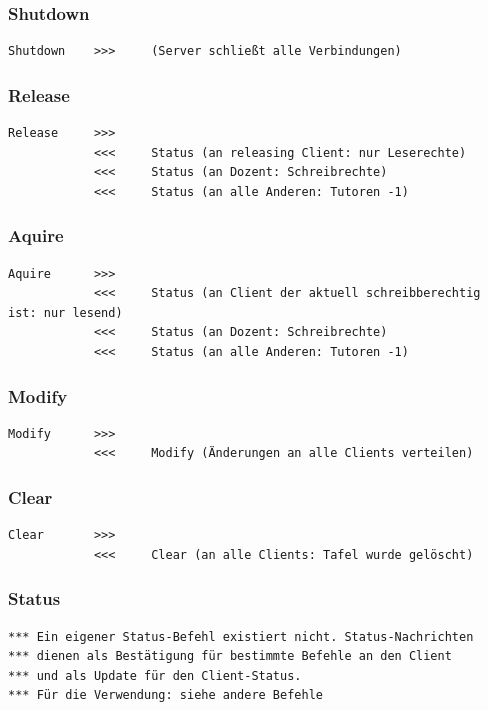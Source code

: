 \subsubsection{Shutdown}
\begin{lstlisting}
Shutdown    >>>     (Server schließt alle Verbindungen)
\end{lstlisting}

\subsubsection{Release}
\begin{lstlisting}
Release     >>>
            <<<     Status (an releasing Client: nur Leserechte)
            <<<     Status (an Dozent: Schreibrechte)
            <<<     Status (an alle Anderen: Tutoren -1)
\end{lstlisting}

\subsubsection{Aquire}
\begin{lstlisting}
Aquire      >>>
            <<<     Status (an Client der aktuell schreibberechtig ist: nur lesend)
            <<<     Status (an Dozent: Schreibrechte)
            <<<     Status (an alle Anderen: Tutoren -1)
\end{lstlisting}

\subsubsection{Modify}
\begin{lstlisting}
Modify      >>>
            <<<     Modify (Änderungen an alle Clients verteilen)
\end{lstlisting}

\subsubsection{Clear}
\begin{lstlisting}
Clear       >>>
            <<<     Clear (an alle Clients: Tafel wurde gelöscht)
\end{lstlisting}

\subsubsection{Status}
\begin{lstlisting}
*** Ein eigener Status-Befehl existiert nicht. Status-Nachrichten
*** dienen als Bestätigung für bestimmte Befehle an den Client
*** und als Update für den Client-Status.
*** Für die Verwendung: siehe andere Befehle
\end{lstlisting}

